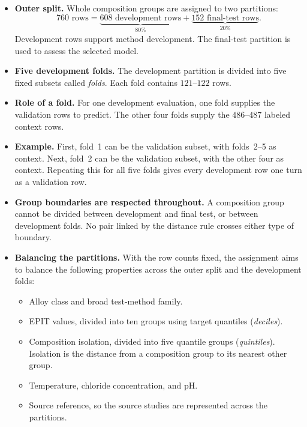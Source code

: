 \documentclass[11pt]{article}
\newenvironment{notes}
  {\begin{itemize}\setlength{\itemsep}{0.45em}\setlength{\parsep}{0pt}}
  {\end{itemize}}
\begin{document}
\begin{notes}
    \item \textbf{Outer split.} Whole composition groups are assigned
    to two partitions:
    \[
        760\text{ rows}
        =
        \underbrace{608\text{ development rows}}_{80\%}
        +
        \underbrace{152\text{ final-test rows}}_{20\%}.
    \]
    Development rows support method development. The final-test
    partition is used to assess the selected model.

    \item \textbf{Five development folds.} The development partition
    is divided into five fixed subsets called \emph{folds}. Each fold
    contains \(121\)--\(122\) rows.

    \item \textbf{Role of a fold.} For one development evaluation,
    one fold supplies the validation rows to predict. The other four
    folds supply the \(486\)--\(487\) labeled context rows.

    \item \textbf{Example.} First, fold~1 can be the validation subset,
    with folds~2--5 as context. Next, fold~2 can be the validation
    subset, with the other four as context. Repeating this for all five
    folds gives every development row one turn as a validation row.

    \item \textbf{Group boundaries are respected throughout.}
    A composition group cannot be divided between development and
    final test, or between development folds. No pair linked by the
    distance rule crosses either type of boundary.

    \item \textbf{Balancing the partitions.} With the row counts fixed,
    the assignment aims to balance the following properties across the
    outer split and the development folds:
    \begin{notes}
        \item Alloy class and broad test-method family.
        \item EPIT values, divided into ten groups using target
        quantiles (\emph{deciles}).
        \item Composition isolation, divided into five quantile
        groups (\emph{quintiles}). Isolation is the distance from a
        composition group to its nearest other group.
        \item Temperature, chloride concentration, and pH.
        \item Source reference, so the source studies are represented
        across the partitions.
    \end{notes}


\end{notes}
\end{document}
